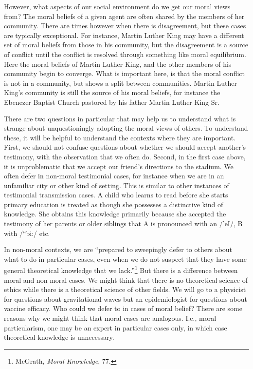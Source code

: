 \documentclass[phdthesis,12pt,final]{wuthesis}
\theoremstyle{definition}
\theoremstyle{definition}
\theoremstyle{definition}
\theoremstyle{definition}
\theoremstyle{remark}
\begin{document}
However, what aspects of our social environment do we get our moral views from? The moral beliefs of a given agent are often shared by the members of her community. There are times however when there is disagreement, but these cases are typically exceptional. For instance, Martin Luther King may have a different set of moral beliefs from those in his community, but the disagreement is a source of conflict until the conflict is resolved through something like moral equilibrium. Here the moral beliefs of Martin Luther King, and the other members of his community begin to converge. What is important here, is that the moral conflict is not in a community, but shows a split between communities. Martin Luther King's community is still the source of his moral beliefs, for instance the Ebenezer Baptist Church pastored by his father Martin Luther King Sr.

There are two questions in particular that may help us to understand what is strange about unquestioningly adopting the moral views of others. To understand these, it will be helpful to understand the contexts where they are important. First, we should not confuse questions about whether we should accept another's testimony, with the observation that we often do. Second, in the first case above, it is unproblematic that we accept our friend's directions to the stadium. We often defer in non-moral testimonial cases, for instance when we are in an unfamiliar city or other kind of setting. This is similar to other instances of testimonial transmission cases. A child who learns to read before she starts primary education is treated as though she possesses a distinctive kind of knowledge. She obtains this knowledge primarily because she accepted the testimony of her parents or older siblings that A is pronounced with an /'eI/, B with /``bi:/ etc.

In non-moral contexts, we are ``prepared to sweepingly defer to others about what to do in particular cases, even when we do not suspect that they have some general theoretical knowledge that we lack.''\footnote{McGrath, \emph{Moral {Knowledge}}, 77.} But there is a difference between moral and non-moral cases. We might think that there is no theoretical science of ethics while there is a theoretical science of other fields. We will go to a physicist for questions about gravitational waves but an epidemiologist for questions about vaccine efficacy. Who could we defer to in cases of moral belief? There are some reasons why we might think that moral cases are analogous. I.e., moral particularism, one may be an expert in particular cases only, in which case theoretical knowledge is unnecessary.
\end{document}
